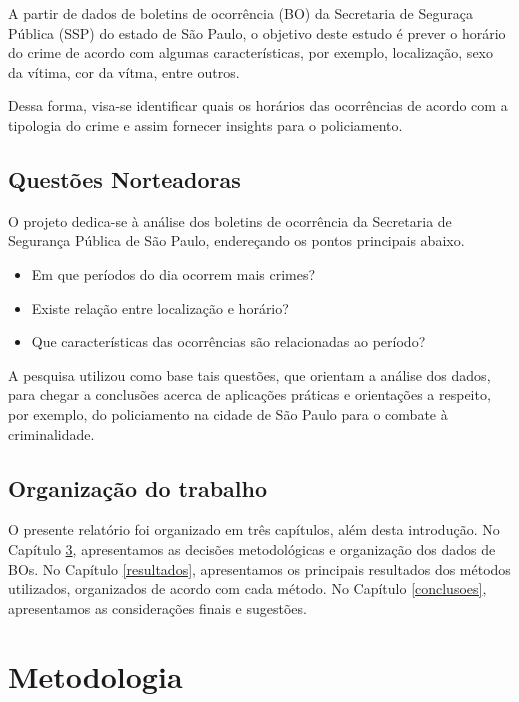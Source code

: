 \documentclass[
  12pt,
  portuguese,
]{report}
\providecommand{\tightlist}{%
  \setlength{\itemsep}{0pt}\setlength{\parskip}{0pt}}
\begin{document}
A partir de dados de boletins de ocorrência (BO) da Secretaria de Seguraça Pública (SSP) do estado de São Paulo, o objetivo deste estudo é prever o horário do crime de acordo com algumas características, por exemplo, localização, sexo da vítima, cor da vítma, entre outros.

Dessa forma, visa-se identificar quais os horários das ocorrências de acordo com a tipologia do crime e assim fornecer insights para o policiamento.

\hypertarget{questuxf5es-norteadoras}{%
\section{Questões Norteadoras}\label{questuxf5es-norteadoras}}

O projeto dedica-se à análise dos boletins de ocorrência da Secretaria de Segurança Pública de São Paulo, endereçando os pontos principais abaixo.

\begin{itemize}
\tightlist
\item
  Em que períodos do dia ocorrem mais crimes?
\item
  Existe relação entre localização e horário?
\item
  Que características das ocorrências são relacionadas ao período?
\end{itemize}

A pesquisa utilizou como base tais questões, que orientam a análise dos dados, para chegar a conclusões acerca de aplicações práticas e orientações a respeito, por exemplo, do policiamento na cidade de São Paulo para o combate à criminalidade.

\hypertarget{organizauxe7uxe3o-do-trabalho}{%
\section{Organização do trabalho}\label{organizauxe7uxe3o-do-trabalho}}

O presente relatório foi organizado em três capítulos, além desta introdução. No Capítulo \ref{metodologia}, apresentamos as decisões metodológicas e organização dos dados de BOs. No Capítulo \ref{resultados}, apresentamos os principais resultados dos métodos utilizados, organizados de acordo com cada método. No Capítulo \ref{conclusoes}, apresentamos as considerações finais e sugestões.

\hypertarget{metodologia}{%
\chapter{Metodologia}\label{metodologia}}
\end{document}
